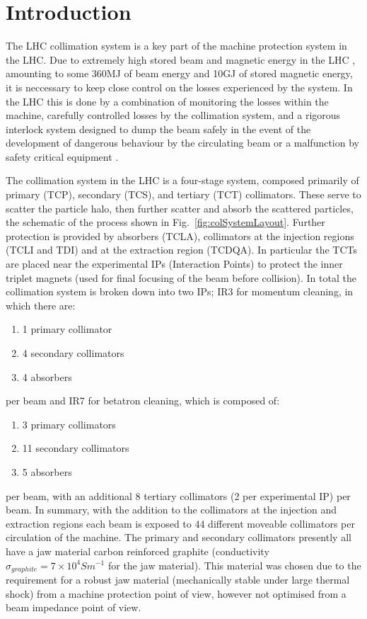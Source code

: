 \section{Introduction}

The LHC collimation system is a key part of the machine protection system in the LHC. Due to extremely high stored beam and magnetic energy in the LHC \cite{Schmidt:LHCMP}, amounting to some 360MJ of beam energy and 10GJ of stored magnetic energy, it is neccessary to keep close control on the losses experienced by the system. In the LHC this is done by a combination of monitoring the losses within the machine, carefully controlled losses by the collimation system, and a rigorous interlock system designed to dump the beam safely in the event of the development of dangerous behaviour by the circulating beam or a malfunction by safety critical equipment \cite{Schmidt:LHCMP}.

The collimation system in the LHC is a four-stage system, composed primarily of primary (TCP), secondary (TCS), and tertiary (TCT) collimators. These serve to scatter the particle halo, then further scatter and absorb the scattered particles, the schematic of the process shown in Fig.~\ref{fig:colSystemLayout}. Further protection is provided by absorbers (TCLA), collimators at the injection regions (TCLI and TDI) and at the extraction region (TCDQA). In particular the TCTs are placed near the experimental IPs (Interaction Points) to protect the inner triplet magnets (used for final focusing of the beam before collision). In total the collimation system is broken down into two IPs; IR3 for momentum cleaning, in which there are:

\begin{enumerate}
\item{1 primary collimator}
\item{4 secondary collimators}
\item{4 absorbers}
\end{enumerate}

per beam and IR7 for betatron cleaning, which is composed of:

\begin{enumerate}
\item{3 primary collimators}
\item{11 secondary collimators}
\item{5 absorbers}
\end{enumerate}

per beam, with an additional 8 tertiary collimators (2 per experimental IP) per beam. In summary, with the addition to the collimators at the injection and extraction regions each beam is exposed to 44 different moveable collimators per circulation of the machine. The primary and secondary collimators presently all have a jaw material carbon reinforced graphite (conductivity $\sigma_{graphite} = 7 \times 10^{4} S m^{-1} $ for the jaw material). This material was chosen due to the requirement for a robust jaw material (mechanically stable under large thermal shock) from a machine protection point of view, however not optimised from a beam impedance point of view.

